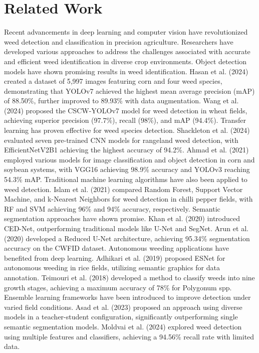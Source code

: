 \section{Related Work}
Recent advancements in deep learning and computer vision have revolutionized weed detection and classification in precision agriculture. Researchers have developed various approaches to address the challenges associated with accurate and efficient weed identification in diverse crop environments.
Object detection models have shown promising results in weed identification. Hasan et al. (2024) \cite{Hasan2024-su} created a dataset of 5,997 images featuring corn and four weed species, demonstrating that YOLOv7 achieved the highest mean average precision (mAP) of 88.50\%, further improved to 89.93\% with data augmentation. Wang et al. (2024) \cite{Wang2024-tt} proposed the CSCW-YOLOv7 model for weed detection in wheat fields, achieving superior precision (97.7\%), recall (98\%), and mAP (94.4\%).
Transfer learning has proven effective for weed species detection. Shackleton et al. (2024) \cite{Shackleton2024-uc} evaluated seven pre-trained CNN models for rangeland weed detection, with EfficientNetV2B1 achieving the highest accuracy of 94.2\%. Ahmad et al. (2021) \cite{Ahmad2021-gs} employed various models for image classification and object detection in corn and soybean systems, with VGG16 achieving 98.9\% accuracy and YOLOv3 reaching 54.3\% mAP.
Traditional machine learning algorithms have also been applied to weed detection. Islam et al. (2021) \cite{Islam2021-iy} compared Random Forest, Support Vector Machine, and k-Nearest Neighbors for weed detection in chilli pepper fields, with RF and SVM achieving 96\% and 94\% accuracy, respectively.
Semantic segmentation approaches have shown promise. Khan et al. (2020) \cite{Khan2020-xb} introduced CED-Net, outperforming traditional models like U-Net and SegNet. Arun et al. (2020) \cite{Arun2020-eu} developed a Reduced U-Net architecture, achieving 95.34\% segmentation accuracy on the CWFID dataset.
Autonomous weeding applications have benefited from deep learning. Adhikari et al. (2019) \cite{Adhikari2019-os} proposed ESNet for autonomous weeding in rice fields, utilizing semantic graphics for data annotation. Teimouri et al. (2018) \cite{Teimouri2018-mx} developed a method to classify weeds into nine growth stages, achieving a maximum accuracy of 78\% for Polygonum spp.
Ensemble learning frameworks have been introduced to improve detection under varied field conditions. Asad et al. (2023) \cite{Asad2023-zv} proposed an approach using diverse models in a teacher-student configuration, significantly outperforming single semantic segmentation models. Moldvai et al. (2024) \cite{Moldvai2024-hb} explored weed detection using multiple features and classifiers, achieving a 94.56\% recall rate with limited data.
